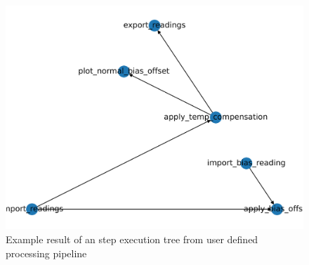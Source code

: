 \begin{figure}
\centering
\includegraphics{./generated_images/border_Example_result_of_an_step_execution_tree_from_user_defined_processing_pipeline.png}
\caption{Example result of an step execution tree from user defined
processing pipeline
\label{Example_result_of_an_step_execution_tree_from_user_defined_processing_pipeline.png}}
\end{figure}

